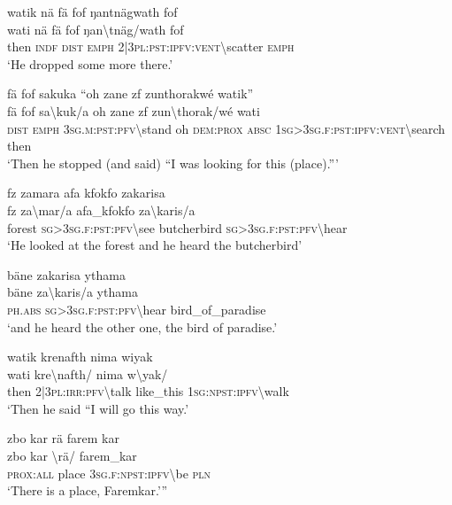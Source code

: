 \ea\label{ex:1:a3737}
watik nä fä fof ŋantnägwath fof\\
\gll wati	nä	fä	fof	ŋan{\textbackslash}tnäg/wath	fof\\
     then	\textsc{indf}	\textsc{dist}	\textsc{emph}	2|3\textsc{pl}:\textsc{pst}:\textsc{ipfv}:\textsc{vent}{\textbackslash}scatter	\textsc{emph}\\
\glt `He dropped some more there.'
\z

\ea\label{ex:1:a3738}
fä fof sakuka ``oh zane zf zunthorakwé watik''\\
\gll fä	fof	sa{\textbackslash}kuk/a	oh	zane	zf	zun{\textbackslash}thorak/wé	wati\\
     \textsc{dist}	\textsc{emph}	3\textsc{sg}.\textsc{m}:\textsc{pst}:\textsc{pfv}{\textbackslash}stand	oh	\textsc{dem}:\textsc{prox}	\textsc{absc}	1\textsc{sg}>3\textsc{sg}.\textsc{f}:\textsc{pst}:\textsc{ipfv}:\textsc{vent}{\textbackslash}search	then\\
\glt `Then he stopped (and said) ``I was looking for this (place).'''
\z

\ea\label{ex:1:a3739}
fz zamara afa kfokfo zakarisa\\
\gll fz	za{\textbackslash}mar/a	afa\_kfokfo	za{\textbackslash}karis/a\\
     forest	\textsc{sg}>3\textsc{sg}.\textsc{f}:\textsc{pst}:\textsc{pfv}{\textbackslash}see	butcherbird	\textsc{sg}>3\textsc{sg}.\textsc{f}:\textsc{pst}:\textsc{pfv}{\textbackslash}hear\\
\glt `He looked at the forest and he heard the butcherbird'
\z

\ea\label{ex:1:a3740}
bäne zakarisa ythama\\
\gll bäne	za{\textbackslash}karis/a	ythama\\
     \textsc{ph}.\textsc{abs}	\textsc{sg}>3\textsc{sg}.\textsc{f}:\textsc{pst}:\textsc{pfv}{\textbackslash}hear	bird\_of\_paradise\\
\glt `and he heard the other one, the bird of paradise.'
\z

\ea\label{ex:1:a3741}
watik krenafth nima wiyak\\
\gll wati	kre{\textbackslash}nafth/	nima	w{\textbackslash}yak/\\
     then	2|3\textsc{pl}:\textsc{irr}:\textsc{pfv}{\textbackslash}talk	like\_this	1\textsc{sg}:\textsc{npst}:\textsc{ipfv}{\textbackslash}walk\\
\glt `Then he said ``I will go this way.'
\z

\ea\label{ex:1:a3742}
zbo kar rä farem kar\\
\gll zbo	kar	{\textbackslash}rä/	farem\_kar\\
     \textsc{prox}:\textsc{all}	place	3\textsc{sg}.\textsc{f}:\textsc{npst}:\textsc{ipfv}{\textbackslash}be	\textsc{pln}\\
\glt `There is a place, Faremkar.'''
\z

